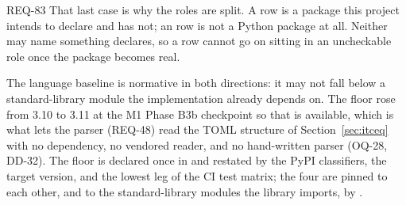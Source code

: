 \begin{reqbox}{REQ-83}{\stable}
That last case is why the roles are split. A  row is a
package this project intends to declare and has not; an
 row is not a Python package at all. Neither may name
something  declares, so a row cannot go on sitting
in an uncheckable role once the package becomes real.

The language baseline is normative in both directions: it may not fall
below a standard-library module the implementation already depends on.
The floor rose from 3.10 to 3.11 at the M1 Phase B3b checkpoint so that
 is available, which is what lets the 
parser (REQ-48) read the TOML structure of Section~\ref{sec:itceq} with
no dependency, no vendored reader, and no hand-written parser (OQ-28,
DD-32). The floor is declared once in  and
restated by the PyPI classifiers, the  target version, and
the lowest leg of the CI test matrix; the four are pinned to each
other, and to the standard-library modules the library imports, by
.
\end{reqbox}

